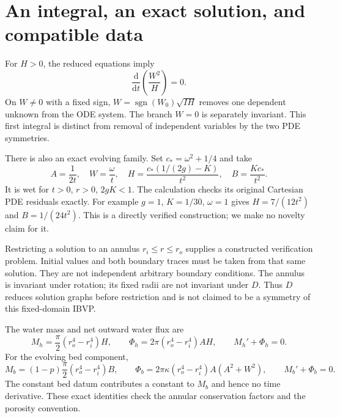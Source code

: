 \documentclass[11pt]{article}
\newcommand{\dd}{\mathrm d}
\begin{document}
\section{An integral, an exact solution, and compatible data}
For $H>0$, the reduced equations imply
\begin{equation}\label{eq:integral}
 \frac{\dd}{\dd t}\left(\frac{W^2}{H}\right)=0.
\end{equation}
On $W\ne0$ with a fixed sign, $W=\operatorname{sgn}(W_0)\sqrt{I H}$
removes one dependent unknown from the ODE system. The branch $W=0$ is
separately invariant. This first integral is distinct from removal of
independent variables by the two PDE symmetries.

There is also an exact evolving family. Set $c_*=\omega^2+1/4$ and take
\begin{equation}\label{eq:exact}
 A=\frac1{2t},\quad W=\frac{\omega}{t},\quad
 H=\frac{c_*(1/(2g)-K)}{t^2},\quad B=\frac{Kc_*}{t^2}.
\end{equation}
It is wet for $t>0$, $r>0$, $2gK<1$. The calculation checks its original
Cartesian PDE residuals exactly. For example $g=1$, $K=1/30$, $\omega=1$
gives $H=7/(12t^2)$ and $B=1/(24t^2)$.
This is a directly verified construction; we make no novelty claim for it.

Restricting a solution to an annulus $r_i\le r\le r_o$ supplies a
constructed verification problem. Initial values and both boundary traces
must be taken from that same solution. They are not independent arbitrary
boundary conditions. The annulus is invariant under rotation; its fixed
radii are not invariant under $D$. Thus $D$ reduces solution graphs before
restriction and is not claimed to be a symmetry of this fixed-domain IBVP.

The water mass and net outward water flux are
\[
 M_h=\frac\pi2(r_o^4-r_i^4)H,\qquad
 \Phi_h=2\pi(r_o^4-r_i^4)AH,\qquad M_h'+\Phi_h=0.
\]
For the evolving bed component,
\[
 M_b=(1-p)\frac\pi2(r_o^4-r_i^4)B,\qquad
 \Phi_b=2\pi\kappa(r_o^4-r_i^4)A(A^2+W^2),\qquad M_b'+\Phi_b=0.
\]
The constant bed datum contributes a constant to $M_b$ and hence no time
derivative. These exact identities check the annular conservation factors
and the porosity convention.
\end{document}
